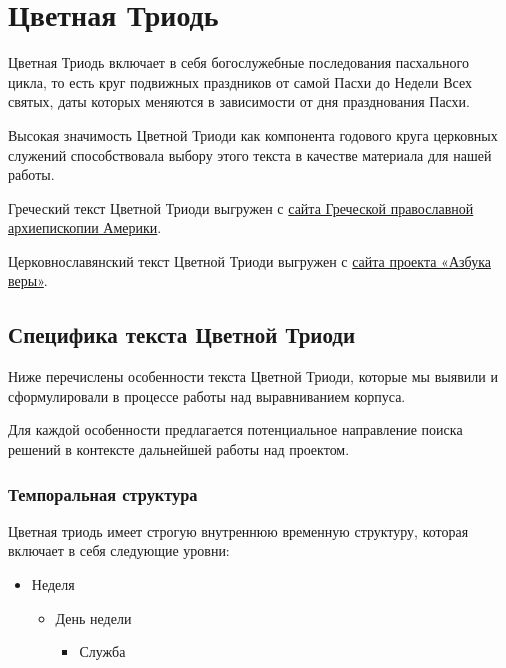 \documentclass[
  letterpaper,
]{book}
\providecommand{\tightlist}{%
  \setlength{\itemsep}{0pt}\setlength{\parskip}{0pt}}\usepackage{longtable,booktabs,array}
\begin{document}
\hfill\break


\hypertarget{sec-about_pent}{%
\chapter{Цветная Триодь}\label{sec-about_pent}}

Цветная Триодь включает в себя богослужебные последования пасхального
цикла, то есть круг подвижных праздников от самой Пасхи до Недели Всех
святых, даты которых меняются в зависимости от дня празднования Пасхи.

Высокая значимость Цветной Триоди как компонента годового круга
церковных служений способствовала выбору этого текста в качестве
материала для нашей работы.

Греческий текст Цветной Триоди выгружен с
\href{https://glt.goarch.org/\#04}{сайта Греческой православной
архиепископии Америки}.

Церковнославянский текст Цветной Триоди выгружен с
\href{https://azbyka.ru/otechnik/Pravoslavnoe_Bogosluzhenie/triod-tsvetnaja/}{сайта
проекта «Азбука веры»}.

\hypertarget{sec-about_pent_specifics}{%
\section{Специфика текста Цветной
Триоди}\label{sec-about_pent_specifics}}

Ниже перечислены особенности текста Цветной Триоди, которые мы выявили и
сформулировали в процессе работы над выравниванием корпуса.

Для каждой особенности предлагается потенциальное направление поиска
решений в контексте дальнейшей работы над проектом.

\hypertarget{sec-temporal_structure}{%
\subsection{Темпоральная структура}\label{sec-temporal_structure}}

Цветная триодь имеет строгую внутреннюю временную структуру, которая
включает в себя следующие уровни:

\begin{itemize}
\item
  Неделя

  \begin{itemize}
  \item
    День недели

    \begin{itemize}
    \tightlist
    \item
      Служба
    \end{itemize}
  \end{itemize}
\end{itemize}
\end{document}
